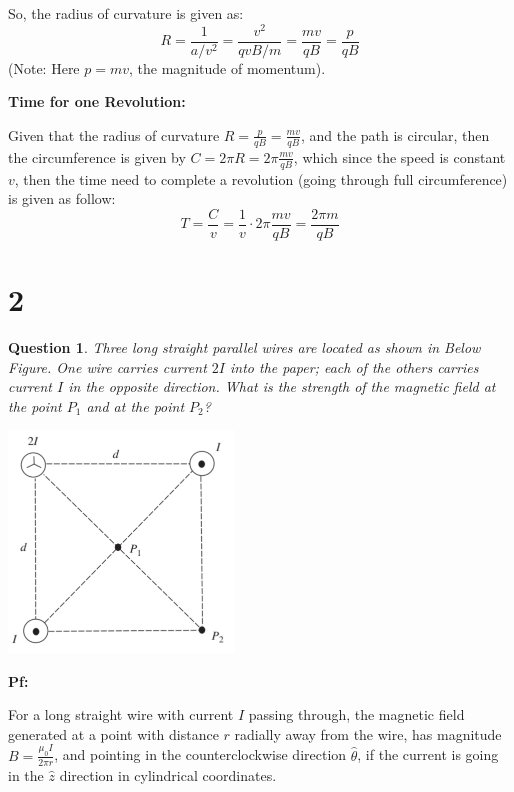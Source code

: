 \documentclass{article}
\newtheorem{question}{Question}
\begin{document}
So, the radius of curvature is given as:
$$R = \frac{1}{a/v^2} = \frac{v^2}{qvB/m} = \frac{mv}{qB} = \frac{p}{qB}$$
(Note: Here $p=mv$, the magnitude of momentum).


\hfill

\textbf{Time for one Revolution:}

Given that the radius of curvature $R = \frac{p}{qB} = \frac{mv}{qB}$, and the path is circular, then the circumference is given by 
$C = 2\pi R = 2\pi \frac{mv}{qB}$, which since the speed is constant $v$, then the time need to complete a revolution (going through full circumference)
is given as follow:
$$T = \frac{C}{v} = \frac{1}{v}\cdot 2\pi \frac{mv}{qB} = \frac{2\pi m}{qB}$$

\break

\section*{2}
\begin{myBox}[]{}
    \begin{question}
        Three long straight parallel wires are located as shown in
        Below Figure. One wire carries current $2I $ into the paper; each of
        the others carries current $I$ in the opposite direction. What is the
        strength of the magnetic field at the point $P_1$ and at the point $P_2$?
    \end{question}

    \begin{center}
        \includegraphics[width=60mm]{Figure.png}
        \label{fig:my_label}
    \end{center}
\end{myBox}

\textbf{Pf:}

For a long straight wire with current $I$ passing through, the magnetic field generated  at a point with distance $r$ radially away from the wire,
has magnitude $B=\frac{\mu_0I}{2\pi r}$, and pointing in the counterclockwise direction $\hat{\theta}$, if the current is going in the $\hat{z}$ direction in cylindrical coordinates.
\end{document}
